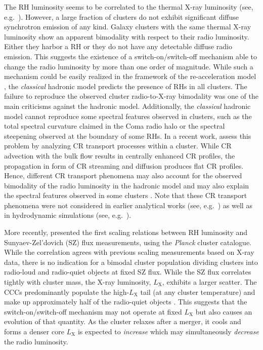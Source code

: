 \documentclass[traditabstract]{aa}
\newcommand{\rmn}{\mathrm}
\begin{document}
The RH luminosity seems to be correlated to the thermal X-ray luminosity (see,
e.g.~\citealp{2009A&A...507..661B,2011A&A...527A..99E}).  However, a large
fraction of clusters do not exhibit significant diffuse synchrotron emission of
any kind. Galaxy clusters with the same thermal X-ray luminosity show an
apparent bimodality with respect to their radio luminosity. Either they harbor a
RH or they do not have any detectable diffuse radio emission.  This suggests the
existence of a switch-on/switch-off mechanism able to change the radio
luminosity by more than one order of magnitude.  While such a mechanism could be
easily realized in the framework of the re-acceleration model
\citep{2009A&A...507..661B}, the \emph{classical} hadronic model predicts the
presence of RHs in all clusters. The failure to reproduce the observed cluster
radio-to-X-ray bimodality was one of the main criticisms against the hadronic
model. Additionally, the \emph{classical} hadronic model cannot reproduce some
spectral features observed in clusters, such as the total spectral curvature
claimed in the Coma radio halo or the spectral steepening observed at the
boundary of some RHs. In a recent work, \cite{2011A&A...527A..99E} assess this
problem by analyzing CR transport processes within a cluster. While CR advection
with the bulk flow results in centrally enhanced CR profiles, the propagation in
form of CR streaming and diffusion produces flat CR profiles. Hence, different
CR transport phenomena may also account for the observed bimodality of the radio
luminosity in the hadronic model and may also explain the spectral features
observed in some clusters \citep{2011A&A...527A..99E}. Note that these CR
transport phenomena were not considered in earlier analytical works (see,
e.g.~\citealp{2004A&A...413...17P}) as well as in hydrodynamic simulations (see,
e.g.~\citealp{2001ApJ...562..233M, 2008MNRAS.385.1211P, 2010MNRAS.409..449P}).

More recently, \cite{2012MNRAS.421L.112B} presented the first scaling relations
between RH luminosity and Sunyaev-Zel'dovich (SZ) flux measurements, using the
\emph{Planck} cluster catalogue. While the correlation agrees with previous
scaling measurements based on X-ray data, there is no indication for a bimodal
cluster population dividing clusters into radio-loud and radio-quiet objects at
fixed SZ flux. While the SZ flux correlates tightly with cluster mass, the X-ray
luminosity, $L_\rmn{X}$, exhibits a larger scatter. The CCCs predominantly
populate the high-$L_\rmn{X}$ tail (at any cluster temperature) and make up
approximately half of the radio-quiet objects \citep{2011A&A...527A..99E}. This
suggests that the switch-on/switch-off mechanism may not operate at fixed
$L_\rmn{X}$ but also causes an evolution of that quantity. As the cluster
relaxes after a merger, it cools and forms a denser core $L_\rmn{X}$ is expected
to {\em increase} which may simultaneously {\em decrease} the radio luminosity.
 
\end{document}

